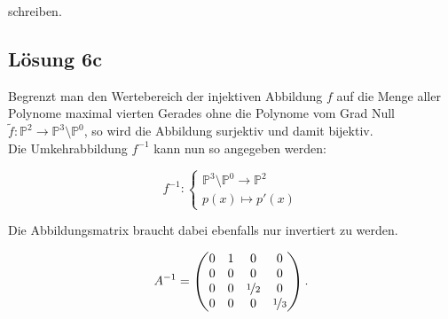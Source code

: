 \documentclass[main.tex]{subfiles}
\begin{document}
schreiben.

\subsection{Lösung 6c}

Begrenzt man den Wertebereich der injektiven Abbildung $f$ auf die Menge aller Polynome
maximal vierten Gerades ohne die Polynome vom Grad Null
$\tilde{f}:\mathbb{P}^2 \to \mathbb{P}^3\setminus \mathbb{P}^0$,
so wird die Abbildung surjektiv und damit bijektiv.\\

Die Umkehrabbildung $f^{-1}$ kann nun so angegeben werden:

$$
    f^{-1} : \begin{cases}
        \mathbb{P}^3 \setminus \mathbb{P}^0 \to \mathbb{P}^2\\
        p(x) \mapsto p'(x)
    \end{cases}
$$

Die Abbildungsmatrix braucht dabei ebenfalls nur invertiert zu werden.

$$
    A^{-1} = \begin{pmatrix}
        0 & 1 & 0 & 0 \\
        0 & 0 & 0 & 0 \\
        0 & 0 & \nicefrac{1}{2} & 0 \\
        0 & 0 & 0& \nicefrac{1}{3}
    \end{pmatrix}.
$$
\end{document}
